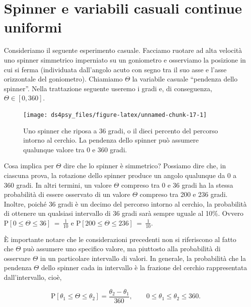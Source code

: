 \documentclass[
  11pt,
]{krantz}
\theoremstyle{definition}
\theoremstyle{definition}
\theoremstyle{definition}
\theoremstyle{definition}
\theoremstyle{remark}
\begin{document}
\hypertarget{spinner-e-variabili-casuali-continue-uniformi}{%
\section{Spinner e variabili casuali continue uniformi}\label{spinner-e-variabili-casuali-continue-uniformi}}

Consideriamo il seguente esperimento casuale. Facciamo ruotare ad alta velocità uno spinner simmetrico imperniato su un goniometro e osserviamo la posizione in cui si ferma (individuata dall'angolo acuto con segno tra il suo asse e l'asse orizzontale del goniometro). Chiamiamo \(\Theta\) la variabile casuale ``pendenza dello spinner''. Nella trattazione seguente useremo i gradi e, di conseguenza, \(\Theta \in [0, 360]\).

\begin{figure}[h]

{\centering \texttt{[image: ds4psy\_files/figure-latex/unnamed-chunk-17-1]} 

}

\caption{Uno spinner che riposa a 36 gradi, o il dieci percento del percorso intorno al cerchio. La pendenza dello spinner può assumere qualunque valore tra 0 e 360 gradi.}\label{fig:unnamed-chunk-17}
\end{figure}

Cosa implica per \(\Theta\) dire che lo spinner è simmetrico? Possiamo dire che, in ciascuna prova, la rotazione dello spinner produce un angolo qualunque da 0 a 360 gradi. In altri termini, un valore \(\Theta\) compreso tra 0 e 36 gradi ha la stessa probabilità di essere osservato di un valore \(\Theta\) compreso tra 200 e 236 gradi. Inoltre, poiché 36 gradi è un decimo del percorso intorno al cerchio, la probabilità di ottenere un qualsiasi intervallo di 36 gradi sarà sempre uguale al 10\%. Ovvero \(\mbox{P}[0 \leq \Theta \leq 36] \ = \ \frac{1}{10}\) e \(\mbox{P}[200 \leq \Theta \leq 236] \ = \ \frac{1}{10}\).

È importante notare che le considerazioni precedenti non si riferiscono al fatto che \(\Theta\) può assumere uno specifico valore, ma piuttosto alla probabilità di osservare \(\Theta\) in un particolare intervallo di valori. In generale, la probabilità che la pendenza \(\Theta\) dello spinner cada in intervallo è la frazione del cerchio rappresentata dall'intervallo, cioè,

\[
\mbox{P}[\theta_1 \leq \Theta \leq \theta_2] = \frac{\theta_2 - \theta_1}{360}, \qquad 0 \leq \theta_1 \leq \theta_2 \leq 360.
\]
\end{document}
